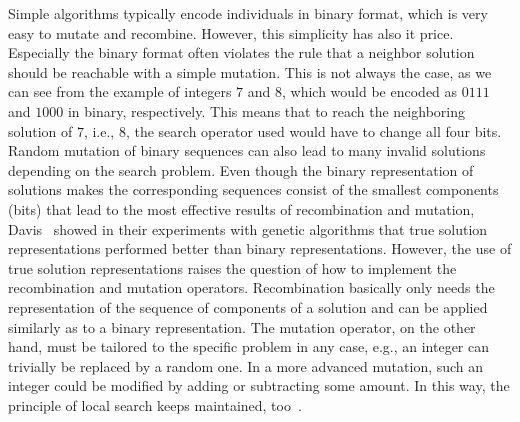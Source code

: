 \documentclass[paper=a4,%
  twoside,%
  BCOR4mm,%
  abstract=true,%
  toc=bibliography,%
  chapterprefix=true,%
  toc=bibliographynumbered,%
  open=right,%
  english,%
  pagesize=pdftex]{scrreprt}
\begin{document}
Simple algorithms typically encode individuals in binary format, which is very easy to mutate and recombine. However, this simplicity has also it price. Especially the binary format often violates the rule that a neighbor solution should be reachable with a simple mutation. This is not always the case, as we can see from the example of integers $7$ and $8$,  which would be encoded as $0111$ and $1000$ in binary, respectively. This means that to reach the neighboring solution of $7$, i.e., $8$, the search operator used would have to change all four bits. Random mutation of binary sequences can also lead to many invalid solutions depending on the search problem. Even though the binary representation of solutions makes the corresponding sequences consist of the smallest components (bits) that lead to the most effective results of recombination and mutation, Davis~\cite{Davis1991} showed in their experiments with genetic algorithms that true solution representations performed better than binary representations. However, the use of true solution representations raises the question of how to implement the recombination and mutation operators. Recombination basically only needs the representation of the sequence of components of a solution and can be applied similarly as to a binary representation. The mutation operator, on the other hand, must be tailored to the specific problem in any case, e.g., an integer can trivially be replaced by a random one. In a more advanced mutation, such an integer could be modified by adding or subtracting some amount. In this way, the principle of local search keeps maintained, too~\cite{Davis1991}.
\end{document}
